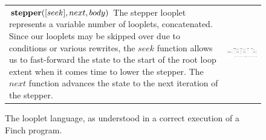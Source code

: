 \begin{figure}[ht]
\begin{tabular} {|l|c|}
\begin{minipage}[c]{0.35\linewidth}
    \end{minipage} \\ \hline
    \begin{minipage}[c]{0.65\linewidth}
        $\text{\textbf{stepper}}([seek], next, body)$ The stepper looplet
        represents a variable number of looplets, concatenated. Since our
        looplets may be skipped over due to conditions or various rewrites, the
        $seek$ function allows us to fast-forward the state to the start of the
        root loop extent when it comes time to lower the stepper. The $next$
        function advances the state to the next iteration of the stepper. 
    \end{minipage} &
    \begin{minipage}[c]{0.35\linewidth}
        \centering
        \includegraphics[scale=0.20]{Looplets-stepper.png}
    \end{minipage} \\\hline
    \end{tabular}
    \caption{The looplet language, as understood in a correct execution of a Finch program.}
\end{figure}